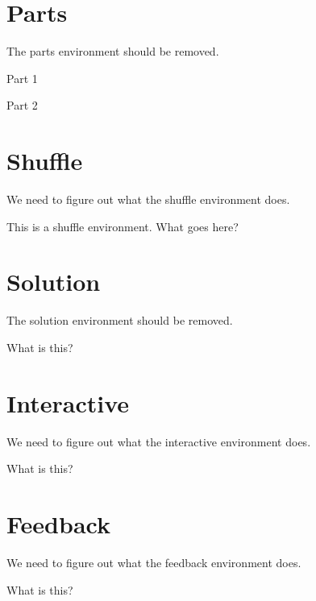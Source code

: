 \documentclass{ximera}
\begin{document}
\section{Parts}

The parts environment should be removed.

\begin{parts} %
\item Part 1
\item Part 2
\end{parts}

\section{Shuffle}

We need to figure out what the shuffle environment does.

\begin{shuffle}
This is a shuffle environment. What goes here?
\end{shuffle}



\section{Solution}

The solution environment should be removed.

\begin{solution} %
What is this?
\end{solution}

\section{Interactive}

We need to figure out what the interactive environment does.

\begin{interactive}
What is this?
\end{interactive}



\section{Feedback}

We need to figure out what the feedback environment does.

\begin{feedback}
What is this?
\end{feedback}
\end{document}
